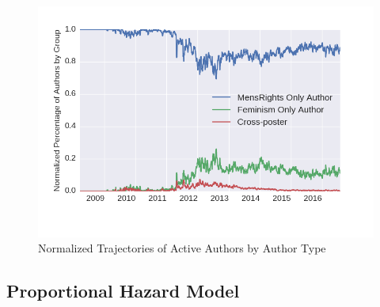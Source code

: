 \documentclass[letterpaper]{article}
\begin{document}
\begin{figure}[tbph]
    \centering
    \includegraphics[scale=0.41]{bc_ratios_seabornstyle}
    \caption{Normalized Trajectories of Active Authors by Author Type}
    \label{fig:bc_ratio}
\end{figure}

\subsection{Proportional Hazard Model}
\end{document}
